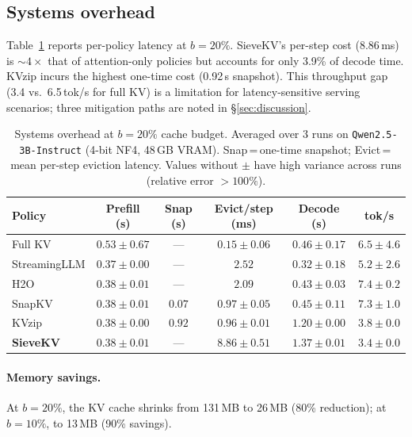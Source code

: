\documentclass[runningheads]{llncs}
\begin{document}
\subsection{Systems overhead}
\label{sec:overhead}

Table~\ref{tab:overhead} reports per-policy latency at $b{=}20\%$.
SieveKV's per-step cost (8.86\,ms) is ${\sim}4{\times}$ that of
attention-only policies but accounts for only 3.9\% of decode time.
KVzip incurs the highest one-time cost (0.92\,s snapshot).
This throughput gap (3.4 vs.\ 6.5\,tok/s for full KV) is a limitation
for latency-sensitive serving scenarios; three mitigation paths are noted in
\S\ref{sec:discussion}.

\begin{table}[htbp]
\caption{Systems overhead at $b{=}20\%$ cache budget. Averaged over 3 runs
on \texttt{Qwen2.5-3B-Instruct} (4-bit NF4, 48\,GB VRAM).
Snap\,=\,one-time snapshot; Evict\,=\,mean per-step eviction latency.
Values without $\pm$ have high variance across runs (relative error $>100\%$).}
\label{tab:overhead}
\centering
\footnotesize
\setlength{\tabcolsep}{3.5pt}
\begin{tabular}{lccccc}
\toprule
Policy & Prefill (s) & Snap (s) & Evict/step (ms) & Decode (s) & tok/s \\
\midrule
Full KV                & $0.53\pm0.67$ & ---     & $0.15\pm0.06$ & $0.46\pm0.17$ & $6.5\pm4.6$ \\
\midrule
StreamingLLM           & $0.37\pm0.00$ & ---     & $2.52$        & $0.32\pm0.18$ & $5.2\pm2.6$ \\
H2O                    & $0.38\pm0.01$ & ---     & $2.09$        & $0.43\pm0.03$ & $7.4\pm0.2$ \\
SnapKV                 & $0.38\pm0.01$ & $0.07$  & $0.97\pm0.05$ & $0.45\pm0.11$ & $7.3\pm1.0$ \\
KVzip                  & $0.38\pm0.00$ & $0.92$  & $0.96\pm0.01$ & $1.20\pm0.00$ & $3.8\pm0.0$ \\
\textbf{SieveKV}  & $0.38\pm0.01$ & ---     & $8.86\pm0.51$ & $1.37\pm0.01$ & $3.4\pm0.0$ \\
\bottomrule
\end{tabular}
\end{table}

\paragraph{Memory savings.}
At $b{=}20\%$, the KV cache shrinks from 131\,MB to 26\,MB (80\%
reduction); at $b{=}10\%$, to 13\,MB (90\% savings).
\end{document}

